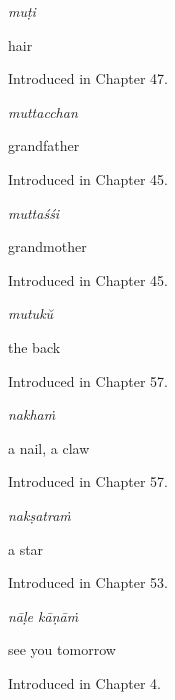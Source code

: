 \noindent\begin{minipage}[t]{\linewidth}
\raggedright
\textbf{}\enspace\emph{muṭi}\par
\small hair\par
\footnotesize Introduced in Chapter 47.
\end{minipage}\par\medskip

\noindent\begin{minipage}[t]{\linewidth}
\raggedright
\textbf{}\enspace\emph{muttacchan}\par
\small grandfather\par
\footnotesize Introduced in Chapter 45.
\end{minipage}\par\medskip

\noindent\begin{minipage}[t]{\linewidth}
\raggedright
\textbf{}\enspace\emph{muttaśśi}\par
\small grandmother\par
\footnotesize Introduced in Chapter 45.
\end{minipage}\par\medskip

\noindent\begin{minipage}[t]{\linewidth}
\raggedright
\textbf{}\enspace\emph{mutukŭ}\par
\small the back\par
\footnotesize Introduced in Chapter 57.
\end{minipage}\par\medskip

\noindent\begin{minipage}[t]{\linewidth}
\raggedright
\textbf{}\enspace\emph{nakhaṁ}\par
\small a nail, a claw\par
\footnotesize Introduced in Chapter 57.
\end{minipage}\par\medskip

\noindent\begin{minipage}[t]{\linewidth}
\raggedright
\textbf{}\enspace\emph{nakṣatraṁ}\par
\small a star\par
\footnotesize Introduced in Chapter 53.
\end{minipage}\par\medskip

\noindent\begin{minipage}[t]{\linewidth}
\raggedright
\textbf{ }\enspace\emph{nāḷe kāṇāṁ}\par
\small see you tomorrow\par
\footnotesize Introduced in Chapter 4.
\end{minipage}\par\medskip

